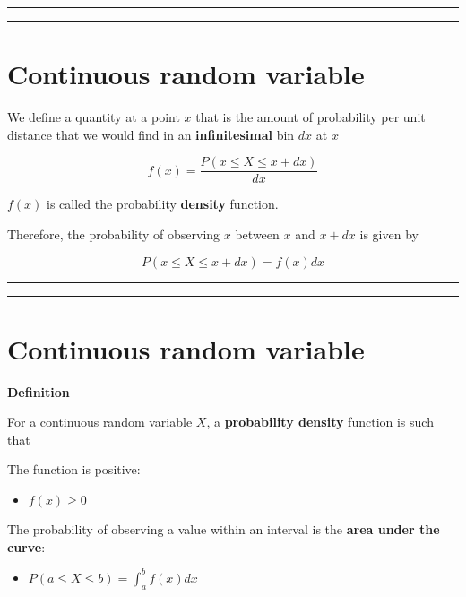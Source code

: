 \documentclass[
]{book}
\providecommand{\tightlist}{%
  \setlength{\itemsep}{0pt}\setlength{\parskip}{0pt}}
\begin{document}
\begin{center}\rule{0.5\linewidth}{0.5pt}\end{center}

\begin{center}\rule{0.5\linewidth}{0.5pt}\end{center}

\hypertarget{continuous-random-variable-2}{%
\section{Continuous random variable}\label{continuous-random-variable-2}}

We define a quantity at a point \(x\) that is the amount of probability per unit distance that we would find in an \textbf{infinitesimal} bin \(dx\) at \(x\)

\[f(x)= \frac{P(x\leq X \leq x+dx)}{dx}\]

\(f(x)\) is called the probability \textbf{density} function.

Therefore, the probability of observing \(x\) between \(x\) and \(x+dx\)
is given by

\[P(x\leq X \leq x+dx)= f(x) dx\]

\begin{center}\rule{0.5\linewidth}{0.5pt}\end{center}

\begin{center}\rule{0.5\linewidth}{0.5pt}\end{center}

\hypertarget{continuous-random-variable-3}{%
\section{Continuous random variable}\label{continuous-random-variable-3}}

\textbf{Definition}

For a continuous random variable \(X\), a \textbf{probability density} function is such that

The function is positive:

\begin{itemize}
\tightlist
\item
  \(f(x) \geq 0\)
\end{itemize}

The probability of observing a value within an interval is the \textbf{area under the curve}:

\begin{itemize}
\tightlist
\item
  \(P(a\leq X \leq b)=\int_{a}^{b} f(x) dx\)
\end{itemize}
\end{document}
